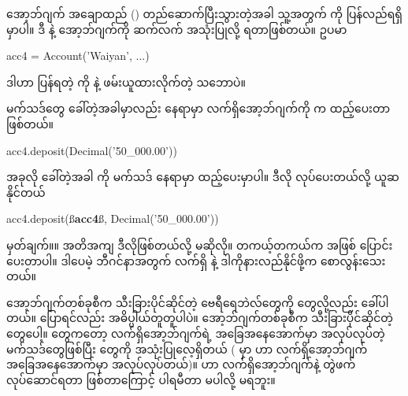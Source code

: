 အော့ဘ်ဂျက် အချောထည် () တည်ဆောက်ပြီးသွားတဲ့အခါ သူ့အတွက်  ကို ပြန်လည်ရရှိမှာပါ။ ဒီ  နဲ့ အော့ဘ်ဂျက်ကို ဆက်လက် အသုံးပြုလို့ ရတာဖြစ်တယ်။ ဥပမာ  
%
\begin{py}
acc4 = Account('Waiyan', ...)
\end{py}
%
ဒါဟာ ပြန်ရတဲ့  ကို  နဲ့ ဖမ်းယူထားလိုက်တဲ့ သဘောပဲ။ 


\fEn{,}   မက်သဒ်တွေ ခေါ်တဲ့အခါမှာလည်း    နေရာမှာ လက်ရှိအော့ဘ်ဂျက်ကို  က ထည့်ပေးတာ ဖြစ်တယ်။ 
%
\begin{py}
acc4.deposit(Decimal('50_000.00'))
\end{py}
%
အခုလို ခေါ်တဲ့အခါ  ကို  မက်သဒ်  နေရာမှာ ထည့်ပေးမှာပါ။ ဒီလို  လုပ်ပေးတယ်လို့ ယူဆနိုင်တယ်
%
\begin{py}
acc4.deposit(ß‌\textbf{acc4}ß, Decimal('50_000.00'))
\end{py}
%
မှတ်ချက်။\qquad ။ အတိအကျ ဒီလိုဖြစ်တယ်လို့ မဆိုလို။ တကယ့်တကယ်က  အဖြစ် ပြောင်းပေးတာပါ။ ဒါပေမဲ့ ဘီဂင်နာအတွက် လက်ရှိ  နဲ့ ဒါကိုနားလည်နိုင်ဖို့က စောလွန်းသေးတယ်။


\begin{mytcbox}
\betweentcboxpar
အော့ဘ်ဂျက်တစ်ခုစီက သီးခြားပိုင်ဆိုင်တဲ့ ဗေရီရေဘဲလ်တွေကို  တွေလို့လည်း ခေါ်ပါတယ်။  ပြောရင်လည်း အဓိပ္ပါယ်တူတူပါပဲ။ အော့ဘ်ဂျက်တစ်ခုစီက သီးခြားပိုင်ဆိုင်တဲ့  တွေပေါ့။ 
\betweentcboxpar
{} တွေကတော့ လက်ရှိအော့ဘ်ဂျက်ရဲ့ အခြေအနေအောက်မှာ အလုပ်လုပ်တဲ့ မက်သဒ်တွေဖြစ်ပြီး   တွေကို အသုံးပြုလေ့ရှိတယ် ( မှာ  ဟာ လက်ရှိအော့ဘ်ဂျက်   အခြေအနေအောက်မှာ အလုပ်လုပ်တယ်)။  ဟာ လက်ရှိအော့ဘ်ဂျက်နဲ့ တွဲဖက်လုပ်ဆောင်ရတာ ဖြစ်တာကြောင့်  ပါရမီတာ မပါလို့ မရဘူး။ 
\end{mytcbox}


